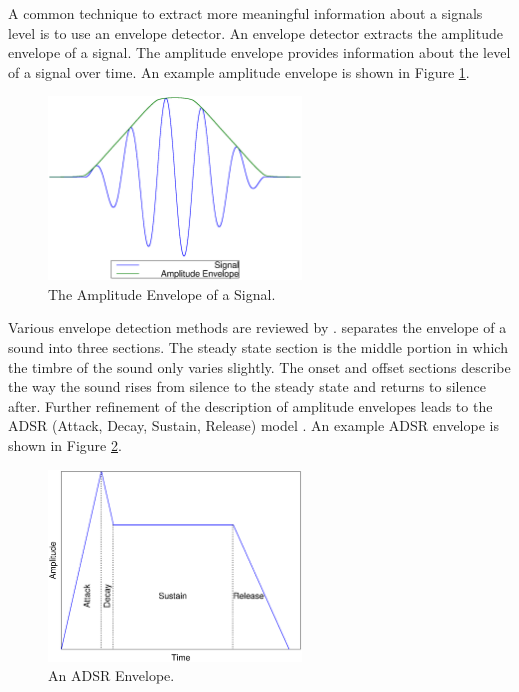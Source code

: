 		A common technique to extract more meaningful information about a signals level is to use an envelope
		detector. An envelope detector extracts the amplitude envelope of a signal. The amplitude envelope provides
		information about the level of a signal over time. An example amplitude envelope is shown in Figure
		\ref{fig:AmplitudeEnvelope}.

		\begin{figure}[h!]
			\centering
			\includegraphics[width=0.6\textwidth]{chapter2/Images/AmplitudeEnvelope.eps}
			\caption{The Amplitude Envelope of a Signal.}
			\label{fig:AmplitudeEnvelope}
		\end{figure}

		Various envelope detection methods are reviewed by \citet{chang2007a}. \citet{howard2009acoustics} separates
		the envelope of a sound into three sections. The steady state section is the middle portion in which the
		timbre of the sound only varies slightly. The onset and offset sections describe the way the sound rises
		from silence to the steady state and returns to silence after. Further refinement of the description of
		amplitude envelopes leads to the ADSR (Attack, Decay, Sustain, Release) model \citep{descrivan2012music}. An
		example ADSR envelope is shown in Figure \ref{fig:ADSR}.

		\begin{figure}[h!]
			\centering
			\includegraphics[width=0.6\textwidth]{chapter2/Images/ADSR.eps}
			\caption{An ADSR Envelope.}
			\label{fig:ADSR}
		\end{figure}

